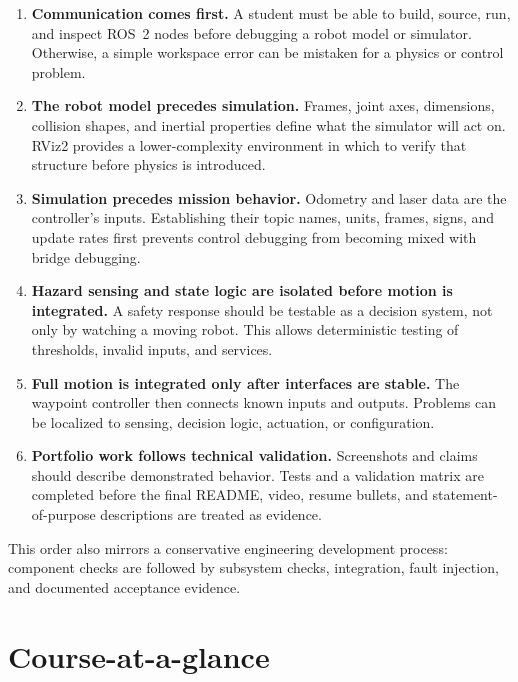 \documentclass[11pt]{article}
\begin{document}
\begin{enumerate}
  \item \textbf{Communication comes first.} A student must be able to build,
        source, run, and inspect ROS~2 nodes before debugging a robot model or
        simulator. Otherwise, a simple workspace error can be mistaken for a
        physics or control problem.
  \item \textbf{The robot model precedes simulation.} Frames, joint axes,
        dimensions, collision shapes, and inertial properties define what the
        simulator will act on. RViz2 provides a lower-complexity environment in
        which to verify that structure before physics is introduced.
  \item \textbf{Simulation precedes mission behavior.} Odometry and laser data
        are the controller's inputs. Establishing their topic names, units,
        frames, signs, and update rates first prevents control debugging from
        becoming mixed with bridge debugging.
  \item \textbf{Hazard sensing and state logic are isolated before motion is
        integrated.} A safety response should be testable as a decision system,
        not only by watching a moving robot. This allows deterministic testing
        of thresholds, invalid inputs, and services.
  \item \textbf{Full motion is integrated only after interfaces are stable.}
        The waypoint controller then connects known inputs and outputs. Problems
        can be localized to sensing, decision logic, actuation, or configuration.
  \item \textbf{Portfolio work follows technical validation.} Screenshots and
        claims should describe demonstrated behavior. Tests and a validation
        matrix are completed before the final README, video, resume bullets, and
        statement-of-purpose descriptions are treated as evidence.
\end{enumerate}

This order also mirrors a conservative engineering development process:
component checks are followed by subsystem checks, integration, fault
injection, and documented acceptance evidence.

\section{Course-at-a-glance}
\end{document}
